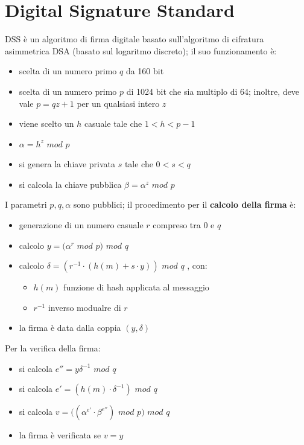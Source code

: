 \chapter{Digital Signature Standard}

DSS è un algoritmo di firma digitale basato sull'algoritmo di cifratura asimmetrica DSA (basato 
sul logaritmo discreto); il suo funzionamento è:
\begin{itemize}
    \item scelta di un numero primo $q$ da 160 bit 
    \item scelta di un numero primo $p$ di 1024 bit che sia multiplo di 64; inoltre, deve 
    vale $p = qz +1$ per un qualsiasi intero $z$
    \item viene scelto un $h$ casuale tale che $1<h<p-1$
    \item $\alpha = h^z$ $mod$ $p$
    \item si genera la chiave privata $s$ tale che $0<s<q$
    \item si calcola la chiave pubblica $\beta = \alpha^z$ $mod$ $p$
\end{itemize}

\noindent I parametri $p, q, \alpha$ sono pubblici; il procedimento per il \textbf{calcolo 
della firma} è:
\begin{itemize}
    \item generazione di un numero casuale $r$ compreso tra 0 e $q$
    \item calcolo $y = (\alpha^r$ $mod$ $p)$ $mod$ $q$
    \item calcolo $\delta = (r^{-1} \cdot (h(m) + s \cdot y))$ $mod$ $q$ , con:
    \begin{itemize}
        \item $h(m)$ funzione di hash applicata al messaggio
        \item $r^{-1}$ inverso modualre di $r$
    \end{itemize}
    \item la firma è data dalla coppia $(y, \delta)$
\end{itemize}

\noindent Per la verifica della firma:
\begin{itemize}
    \item si calcola $e'' = y\delta^{-1}$ $mod$ $q$
    \item si calcola $e' = (h(m) \cdot \delta^{-1})$ $mod$ $q$
    \item si calcola $v = ((\alpha^{e'} \cdot \beta^{e''})$ $mod$ $p)$ $mod$ $q$
    \item la firma è verificata se $v=y$
\end{itemize}

